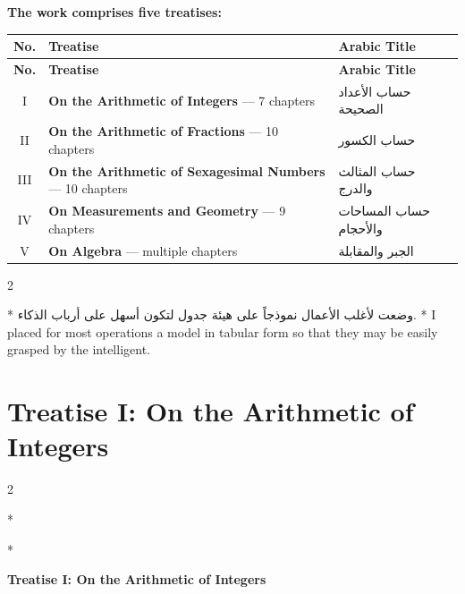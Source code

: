 \documentclass[11pt,a4paper]{article}
\newcommand{\ar}[1]{{\arabicfont\beginR #1\endR}}
\newenvironment{bilingual}{%
  \vspace{0.3em}%
  \begin{paracol}{2}%
}{%
  \end{paracol}%
  \vspace{0.3em}%
}
\begin{document}
\vspace{0.5cm}

\noindent\textbf{The work comprises five treatises:}

\begin{longtable}{|c|p{7cm}|p{5cm}|}
\hline
\textbf{No.} & \textbf{Treatise} & \textbf{Arabic Title} \\
\hline
\endfirsthead
\hline
\textbf{No.} & \textbf{Treatise} & \textbf{Arabic Title} \\
\hline
\endhead
I & \textbf{On the Arithmetic of Integers} --- 7 chapters & \ar{حساب الأعداد الصحيحة} \\
\hline
II & \textbf{On the Arithmetic of Fractions} --- 10 chapters & \ar{حساب الكسور} \\
\hline
III & \textbf{On the Arithmetic of Sexagesimal Numbers} --- 10 chapters & \ar{حساب المثالث والدرج} \\
\hline
IV & \textbf{On Measurements and Geometry} --- 9 chapters & \ar{حساب المساحات والأحجام} \\
\hline
V & \textbf{On Algebra} --- multiple chapters & \ar{الجبر والمقابلة} \\
\hline
\end{longtable}

\begin{bilingual}
\switchcolumn[0]*
\ar{وضعت لأغلب الأعمال نموذجاً على هيئة جدول لتكون أسهل على أرباب الذكاء.}
\switchcolumn[1]*
I placed for most operations a model in tabular form so that they may be
easily grasped by the intelligent.
\end{bilingual}
\clearpage


\section{Treatise I: On the Arithmetic of Integers}
\label{sec:treatise1}

\begin{bilingual}
\switchcolumn[0]*
\begin{center}
\textbf{\Large\color{chapcolor}\ar{المقالة الأولى في حساب الأعداد الصحيحة}}
\end{center}
\switchcolumn[1]*
\begin{center}
\textbf{\Large\color{chapcolor}Treatise I: On the Arithmetic of Integers}
\end{center}
\end{bilingual}
\end{document}
